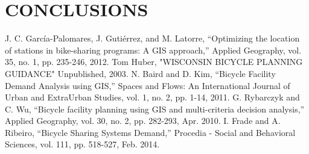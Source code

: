 \documentclass[journal, letterpaper]{IEEEtran}
\begin{document}
\section{CONCLUSIONS}
\large
\begin{thebibliography}{99}

 J. C. García-Palomares, J. Gutiérrez, and M. Latorre, “Optimizing the location of stations in bike-sharing programs: A GIS approach,” Applied Geography, vol. 35, no. 1, pp. 235-246, 2012.
 Tom Huber, "WISCONSIN BICYCLE PLANNING GUIDANCE" Unpublished, 2003.
 N. Baird and D. Kim, “Bicycle Facility Demand Analysis using GIS,” Spaces and Flows: An International Journal of Urban and ExtraUrban Studies, vol. 1, no. 2, pp. 1-14, 2011.
 G. Rybarczyk and C. Wu, “Bicycle facility planning using GIS and multi-criteria decision analysis,” Applied Geography, vol. 30, no. 2, pp. 282-293, Apr. 2010.
 I. Frade and A. Ribeiro, “Bicycle Sharing Systems Demand,” Procedia - Social and Behavioral Sciences, vol. 111, pp. 518-527, Feb. 2014.
 
\end{thebibliography}
\end{document}
